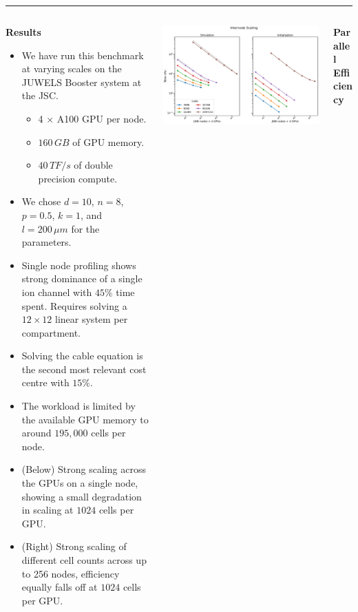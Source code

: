 \documentclass{beamer}
\begin{document}
\begin{frame}[t, fragile]
  \vspace*{1ex}
  \textcolor{arborange}{\rule{\textwidth}{0.5ex}}
  \vspace*{-1ex}
  \begin{columns}[t]
    \begin{column}[T]{0.25\textwidth}
      \textbf{Results}
      \begin{itemize}
        \item We have run this benchmark at varying scales on the JUWELS Booster
        system at the JSC.
        \begin{itemize}
          \item 4 $\times$ A100 GPU per node.
          \item $160\,GB$ of GPU memory.
          \item $40\, TF/s$ of double precision compute.
        \end{itemize}
        \item We chose $d=10$, $n=8$, $p=0.5$, $k=1$, and $l=200\,\mu m$ for the
              parameters.
        \item Single node profiling shows strong dominance of a single ion
              channel with $45\%$ time spent. Requires solving a
              $12\times 12$ linear system per compartment.
        \item Solving the cable equation is the second most relevant cost centre with $15\%$.
        \item The workload is limited by the available GPU memory to around
              $195,000$ cells per node.
        \item (Below) Strong scaling across the GPUs on a single node, showing a
              small degradation in scaling at $1024$ cells per GPU.
        \item (Right) Strong scaling of different cell counts across up to 256
              nodes, efficiency equally falls off at $1024$ cells per GPU.
      \end{itemize}
    \end{column}
    \begin{column}[T]{0.45\textwidth}
      \includegraphics[width=\textwidth]{internode}
    \end{column}
    \begin{column}[T]{0.25\textwidth}
      \textbf{Parallel Efficiency}


\end{column}
\end{columns}
\end{frame}
\end{document}
